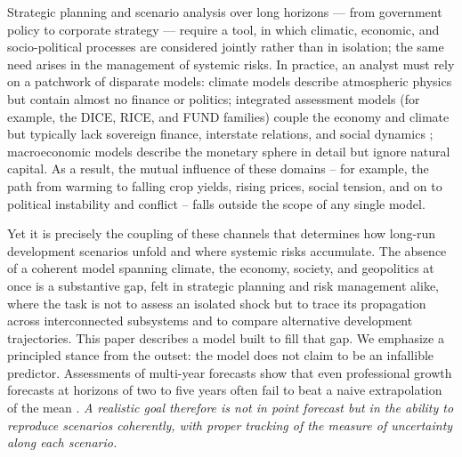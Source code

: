 \documentclass[a4paper,fleqn]{cas-sc}
\newcommand{\response}[1]{\medskip\noindent\textcolor{blue}{\small\itshape [Addressed: #1]}\medskip}
\begin{document}

Strategic planning and scenario analysis over long horizons --- from government policy to
corporate strategy --- require a tool, in which climatic, economic, and socio-political processes
are considered jointly rather than in isolation; the same need arises in the management of
systemic risks. In practice, an analyst must rely on a patchwork of disparate models: climate
models describe atmospheric physics but contain almost no finance or politics; integrated
assessment models (for example, the DICE, RICE, and FUND families) couple the economy and climate
but typically lack sovereign finance, interstate relations, and social dynamics \citep{nordhaus2017}; macroeconomic models describe the monetary sphere in detail but ignore natural capital. As a result, the mutual influence of these domains -- for example, the path from warming to falling crop yields, rising prices, social tension, and on to political instability and conflict -- falls outside the scope of any single model.

Yet it is precisely the coupling of these channels that determines how long-run development
scenarios unfold and where systemic risks accumulate. The absence of a coherent model spanning
climate, the economy, society, and geopolitics at once is a substantive gap, felt in strategic
planning and risk management alike, where the task is not to assess an isolated shock but to trace
its propagation across interconnected subsystems and to compare alternative development
trajectories. This paper describes a model built to fill that gap. We emphasize a principled stance
from the outset: the model does not claim to be an infallible predictor. Assessments of multi-year
forecasts show that even professional growth forecasts at horizons of two to five years often fail
to beat a naive extrapolation of the mean \citep{celasun2021}. {\it A realistic goal therefore is not
in point forecast but in the ability to reproduce scenarios coherently, with proper tracking of the measure of uncertainty along each scenario.}
\end{document}

